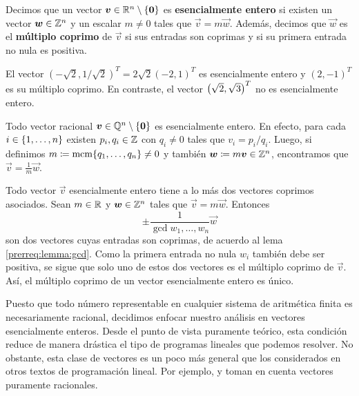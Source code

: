 \begin{definition}
	\label{theory:def:rational}
	Decimos que un vector $\boldsymbol{v} \in \mathbb{R}^n \setminus \lbrace \boldsymbol{0} \rbrace$ es
	\textbf{esencialmente entero} si existen un vector $\boldsymbol{w} \in \mathbb{Z}^n$ y un escalar $m \neq 0$
	tales que $\vec{v} = m\vec{w}$. Además, decimos que $\vec{w}$ es el \textbf{múltiplo coprimo} de
	$\vec{v}$ si sus entradas son coprimas y si su primera entrada no nula es positiva.
\end{definition}
\begin{example}
	El vector $\left(-\sqrt{2}, 1/\sqrt{2}\right)^T = 2\sqrt{2}(-2, 1)^T$ es esencialmente entero
	y $(2, -1)^T$ es su múltiplo coprimo. En contraste, el vector $\left( \sqrt{2}, \sqrt{3} \right)^T$ no es
	esencialmente entero.
\end{example}
\begin{observation}
	Todo vector racional $\boldsymbol{v} \in \mathbb{Q}^n \setminus \lbrace \boldsymbol{0} \rbrace $  es esencialmente
	entero. En efecto, para cada $i \in \lbrace 1, \ldots, n \rbrace$ existen $p_i, q_i \in
	\mathbb{Z}$ con $q_i \neq 0$ tales que $v_i = p_i/q_i$. Luego, si definimos $m \coloneq \mathop{\mathrm{mcm}{\left\lbrace q_1,
	\ldots, q_n \right\rbrace}} \neq 0$ y también $\boldsymbol{w} \coloneq m\boldsymbol{v} \in \mathbb{Z}^n$, encontramos que $\vec{v} =
	\frac{1}{m}\vec{w}$.
\end{observation}
\begin{observation}
	\label{obs:coprime-unique}
	Todo vector $\vec{v}$ esencialmente entero tiene a lo más dos vectores coprimos asociados. Sean
	$m \in \mathbb{R}$ y $\boldsymbol{w} \in \mathbb{Z}^n$ tales que $\vec{v} = m\vec{w}$. Entonces
	\begin{equation*}
		\pm \frac{1}{\gcd{w_1, \ldots, w_n}}\vec{w}
	\end{equation*}
	son dos vectores cuyas entradas son coprimas, de acuerdo al lema \ref{prerreq:lemma:gcd}. Como
	la primera entrada no nula $w_i$ también debe ser positiva, se sigue que solo uno de estos dos
	vectores es el múltiplo coprimo de $\vec{v}$. Así, el múltiplo coprimo de un vector
	esencialmente entero es único.
\end{observation}

Puesto que todo número representable en cualquier sistema de aritmética finita es necesariamente
racional, decidimos enfocar nuestro análisis en vectores esencialmente enteros. Desde el punto de
vista puramente teórico, esta condición reduce de manera drástica el tipo de programas lineales que
podemos resolver. No obstante, esta clase de vectores es un poco más general que los considerados en
otros textos de programación lineal. Por ejemplo, \cite{martello} y \cite{alex} toman en cuenta
vectores puramente racionales.

